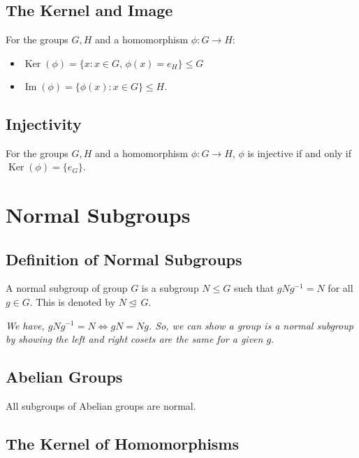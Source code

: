 \documentclass[a4paper, 12pt, twoside]{article}
\DeclareMathOperator{\Ker}{Ker}
\DeclareMathOperator{\Ima}{Im}
\begin{document}
\subsection{The Kernel and Image}

For the groups $G, H$ and a homomorphism $\phi : G \to H$:

\begin{itemize}
      \item $\Ker(\phi) = \{x : x \in G, \, \phi(x) = e_H\} \leq G$
      \item $\Ima(\phi) = \{\phi(x) : x \in G\} \leq H$.
\end{itemize}

\subsection{Injectivity}

For the groups $G, H$ and a homomorphism $\phi : G \to H$,
$\phi$ is injective if and only if $\Ker(\phi) = \{e_G\}$.

\newpage

\section{Normal Subgroups}

\subsection{Definition of Normal Subgroups}

A normal subgroup of group $G$ is a subgroup $N \leq G$
such that $gNg^{-1} = N$ for all $g \in G$. This is denoted by
$N \unlhd \, G$.

\vspace{\baselineskip}

\textit{We have, $gNg^{-1} = N \Leftrightarrow gN = Ng$. So, we can show a
group is a normal subgroup by showing the left and right
cosets are the same for a given $g$.}

\subsection{Abelian Groups}

All subgroups of Abelian groups are normal.

\subsection{The Kernel of Homomorphisms}
\end{document}
